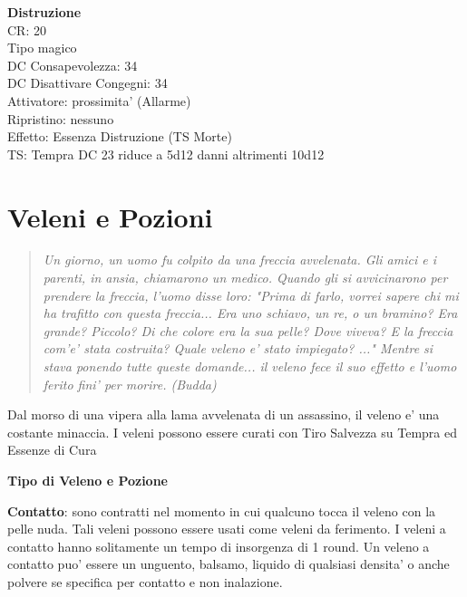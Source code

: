 \documentclass[a4paper,11pt,twoside,openany]{book}
\begin{document}
{\begin{multicols}{2}
\textbf{Distruzione}\\
CR: 20 \\
Tipo magico \\
DC Consapevolezza: 34 \\
DC Disattivare Congegni: 34 \\
Attivatore: prossimita' (Allarme) \\
Ripristino: nessuno \\
Effetto: Essenza Distruzione (TS Morte)\\
TS: Tempra DC 23 riduce a 5d12 danni altrimenti 10d12\\

\end{multicols}

\pagebreak


\section{Veleni e Pozioni}

\label{veleni-e-pozioni}


\begin{quote}\textit{
Un giorno, un uomo fu colpito da una freccia avvelenata. Gli amici e i parenti, in ansia, chiamarono un medico. Quando gli si avvicinarono per prendere la freccia, l'uomo disse loro: "Prima di farlo, vorrei sapere chi mi ha trafitto con questa freccia... Era uno schiavo, un re, o un bramino? Era grande? Piccolo? Di che colore era la sua pelle? Dove viveva? E la freccia com'e' stata costruita? Quale veleno e' stato impiegato? ..." Mentre si stava ponendo tutte queste domande... il veleno fece il suo effetto e l'uomo ferito fini' per morire. (Budda)
}\end{quote}


Dal morso di una vipera alla lama avvelenata di un assassino, il veleno e' una costante minaccia. I veleni possono essere curati con Tiro Salvezza su Tempra ed Essenze di Cura

\bigskip

\textbf{Tipo di Veleno e Pozione}

\textbf{Contatto}: sono contratti nel momento in cui qualcuno tocca il veleno con la pelle nuda. Tali veleni possono essere usati come veleni da ferimento. I veleni a contatto hanno solitamente un tempo di insorgenza di 1 round. Un veleno a contatto puo' essere un unguento, balsamo, liquido di qualsiasi densita' o anche polvere se specifica per contatto e non inalazione.

}
\end{document}
